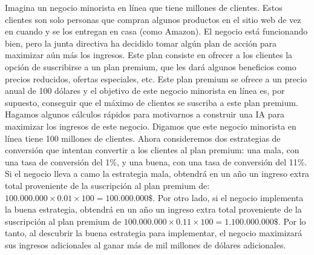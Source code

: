 \documentclass[
]{book}
\begin{document}
Imagina un negocio minorista en línea que tiene millones de clientes. Estos clientes son solo personas que compran algunos productos en el sitio web de vez en cuando y se los entregan en casa (como Amazon). El negocio está funcionando bien, pero la junta directiva ha decidido tomar algún plan de acción para maximizar aún más los ingresos. Este plan consiste en ofrecer a los clientes la opción de suscribirse a un plan premium, que les dará algunos beneficios como precios reducidos, ofertas especiales, etc. Este plan premium se ofrece a un precio anual de 100 dólares y el objetivo de este negocio minorista en línea es, por supuesto, conseguir que el máximo de clientes se suscriba a este plan premium. Hagamos algunos cálculos rápidos para motivarnos a construir una IA para maximizar los ingresos de este negocio. Digamos que este negocio minorista en línea tiene 100 millones de clientes. Ahora consideremos dos estrategias de conversión que intentan convertir a los clientes al plan premium: una mala, con una tasa de conversión del 1\%, y una buena, con una tasa de conversión del 11\%. Si el negocio lleva a camo la estrategia mala, obtendrá en un año un ingreso extra total proveniente de la suscripción al plan premium de: \(100.000.000 \times 0.01 \times 100 = 100.000.000\$\). Por otro lado, si el negocio implementa la buena estrategia, obtendrá en un año un ingreso extra total proveniente de la suscripción al plan premium de \(100.000.000 \times 0.11 \times 100 = 1.100.000.000\$\). Por lo tanto, al descubrir la buena estrategia para implementar, el negocio maximizará sus ingresos adicionales al ganar más de mil millones de dólares adicionales.
\end{document}
